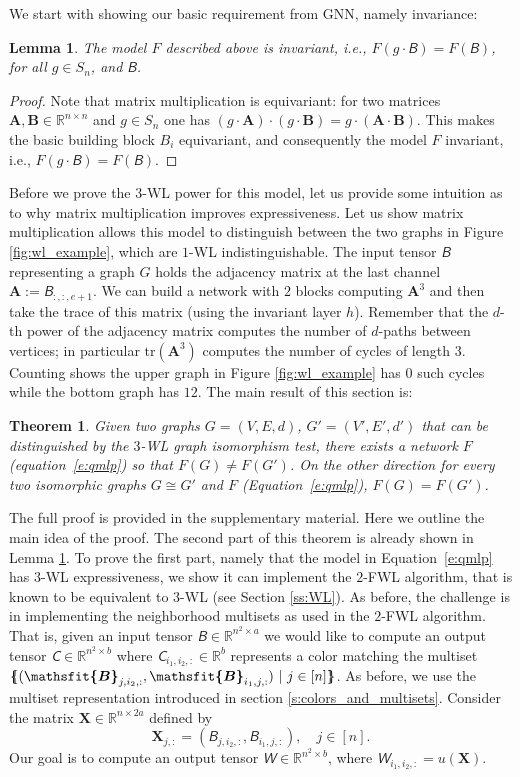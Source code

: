 \documentclass{article}
\newcommand{\mmset}[1]{\{\kern-.4em\{ #1 \}\kern-.4em\}}
\newcommand{\Real}{\mathbb R}
\newtheorem{theorem}{Theorem}
\newtheorem{lemma}{Lemma}
\newcommand{\ie}{{i.e.}}
\def\eqref#1{equation~\ref{#1}}
\def\Eqref#1{Equation~\ref{#1}}
\def\mA{{\bm{A}}}
\def\mB{{\bm{B}}}
\def\mX{{\bm{X}}}
\newcommand{\tens}[1]{\bm{\mathsfit{#1}}}
\def\tB{{\tens{B}}}
\def\tC{{\tens{C}}}
\def\tW{{\tens{W}}}
\begin{document}
We start with showing our basic requirement from GNN, namely invariance:
\begin{lemma}\label{lem:qmlp_invariance}
The model $F$ described above is invariant, \ie, $F(g\cdot \tB)=F(\tB)$, for all $g\in S_n$, and $\tB$.
\end{lemma}
\begin{proof}
Note that matrix multiplication is equivariant: for two matrices $\mA,\mB\in\Real^{n\times n}$ and $g\in S_n$ one has $(g\cdot \mA)\cdot (g\cdot \mB) = g\cdot (\mA\cdot \mB)$. This makes the basic building block $B_i$ equivariant, and consequently the model $F$ invariant, \ie,  $F(g\cdot \tB)=F(\tB)$. 
\end{proof}


Before we prove the $3$-WL power for this model, let us provide some intuition as to why matrix multiplication improves expressiveness. Let us show matrix multiplication allows this model to distinguish between the two graphs in Figure \ref{fig:wl_example}, which are $1$-WL indistinguishable. The input tensor $\tB$ representing a graph $G$ holds the adjacency matrix at the last channel $\mA:=\tB_{:,:,e+1}$. We can build a network with $2$ blocks computing $\mA^3$ and then take the trace of this matrix (using the invariant layer $h$). Remember that the $d$-th power of the adjacency matrix computes the number of $d$-paths between vertices; in particular $\mathrm{tr}(\mA^3)$ computes the number of cycles of length $3$. Counting shows the upper graph in Figure \ref{fig:wl_example} has $0$ such cycles while the bottom graph has $12$.  The main result of this section is:


\begin{theorem}\label{thm:3_WL}
Given two graphs $G=(V,E,d)$, $G'=(V',E',d')$ that can be distinguished by the $3$-WL graph isomorphism test, there exists a network $F$ (\eqref{e:qmlp}) so that $F(G)\ne F(G')$. On the other direction for every two isomorphic graphs $G\cong G'$ and $F$ (\Eqref{e:qmlp}), $F(G)=F(G')$.
\end{theorem}
The full proof is provided in the supplementary material. Here we outline the main idea of the proof. The second part of this theorem is already shown in Lemma \ref{lem:qmlp_invariance}. To prove the first part, namely that the model in \Eqref{e:qmlp} has $3$-WL expressiveness, we show it can implement the $2$-FWL algorithm, that is known to be equivalent to $3$-WL (see Section \ref{ss:WL}). As before, the challenge is in implementing the neighborhood multisets as used in the $2$-FWL algorithm. That is, given an input tensor $\tB\in\Real^{n^2\times a}$ we would like to compute an output tensor $\tC\in\Real^{n^2\times b}$ where $\tC_{i_1,i_2,:}\in\Real^b$ represents a color matching the multiset $\mmset{(\tB_{j,i_2,:},\tB_{i_1,j,:}) \ \vert \ j\in [n]}$.  
As before, we use the multiset representation introduced in section \ref{s:colors_and_multisets}. Consider the matrix $\mX\in\Real^{n \times 2a}$ defined by
\begin{equation}\label{e:mX}
 \mX_{j,:}=(\tB_{j,i_2,:},\tB_{i_1,j,:}), \quad j\in [n].
\end{equation}
Our goal is to compute an output tensor $\tW\in\Real^{n^2\times b}$, where $\tW_{i_1,i_2,:} = u(\mX)$. 
\end{document}
